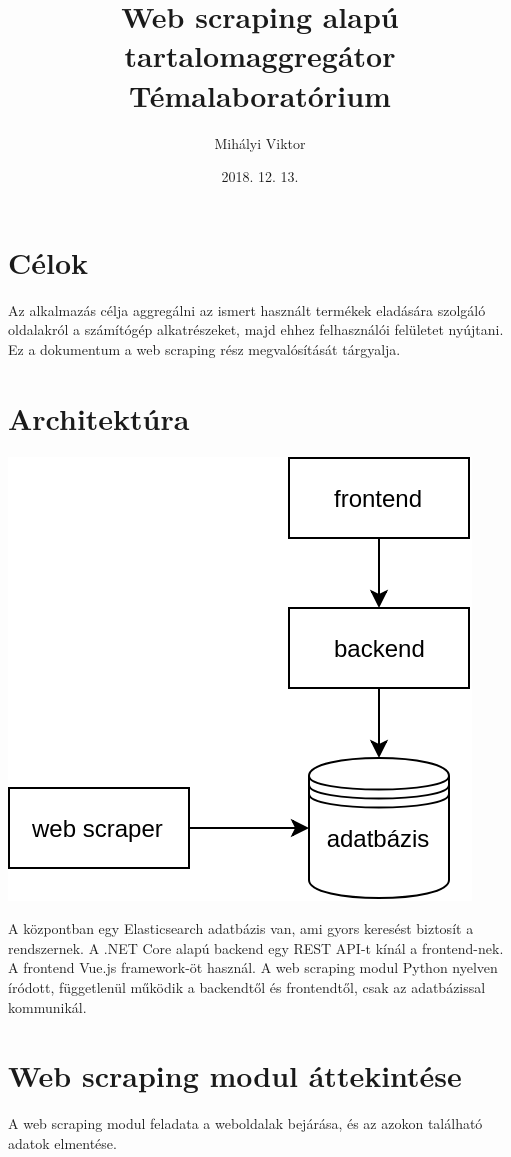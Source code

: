 \documentclass[10pt]{article}
\title{Web scraping alapú tartalomaggregátor \\ \Large{Témalaboratórium}}
\author{Mihályi Viktor}
\date{2018. 12. 13.}
\begin{document}
\maketitle
\tableofcontents

\section{Célok}
Az alkalmazás célja aggregálni az ismert használt termékek eladására szolgáló oldalakról a számítógép alkatrészeket, majd ehhez felhasználói felületet nyújtani. Ez a dokumentum a web scraping rész megvalósítását tárgyalja.

\section{Architektúra}
\begin{center}
    \includegraphics[scale=0.33]{arch.png}
\end{center}

A központban egy Elasticsearch adatbázis van, ami gyors keresést biztosít a rendszernek. A .NET Core alapú backend egy REST API-t kínál a frontend-nek. A frontend Vue.js framework-öt használ. A web scraping modul Python nyelven íródott, függetlenül működik a backendtől és frontendtől, csak az adatbázissal kommunikál.


\section{Web scraping modul áttekintése}
A web scraping modul feladata a weboldalak bejárása, és az azokon található adatok elmentése.
\end{document}
